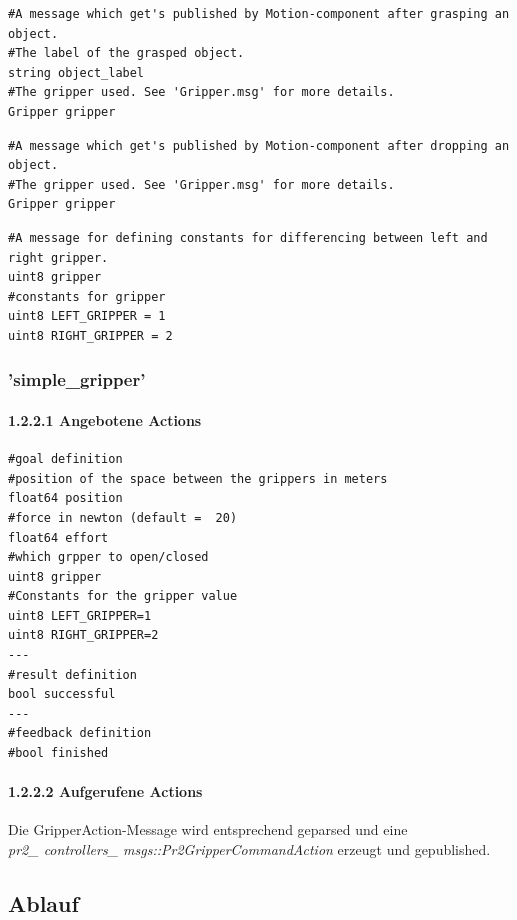 \documentclass{suturo}
\begin{document}
\begin{lstlisting}[caption={Definition der GraspObject.msg},captionpos=b]
#A message which get's published by Motion-component after grasping an object.
#The label of the grasped object.
string object_label
#The gripper used. See 'Gripper.msg' for more details.
Gripper gripper
\end{lstlisting}

\begin{lstlisting}[caption={Definition der DropObject.msg},captionpos=b]
#A message which get's published by Motion-component after dropping an object.
#The gripper used. See 'Gripper.msg' for more details.
Gripper gripper
\end{lstlisting}

\begin{lstlisting}[caption={Definition der Gripper.msg},captionpos=b]
#A message for defining constants for differencing between left and right gripper.
uint8 gripper
#constants for gripper
uint8 LEFT_GRIPPER = 1
uint8 RIGHT_GRIPPER = 2
\end{lstlisting}

\subsubsection{'simple\_gripper'}
\paragraph{1.2.2.1 Angebotene Actions}
\begin{lstlisting}[caption={Definition der GripperAction},captionpos=b]
#goal definition
#position of the space between the grippers in meters
float64 position
#force in newton (default =  20)
float64 effort
#which grpper to open/closed
uint8 gripper
#Constants for the gripper value
uint8 LEFT_GRIPPER=1
uint8 RIGHT_GRIPPER=2
---
#result definition
bool successful
---
#feedback definition
#bool finished
\end{lstlisting}
\paragraph{1.2.2.2 Aufgerufene Actions}
Die GripperAction-Message wird entsprechend geparsed und eine \\
 \textit{pr2\_ controllers\_ msgs::Pr2GripperCommandAction} erzeugt und gepublished. \\

\subsection{Ablauf}
\end{document}
